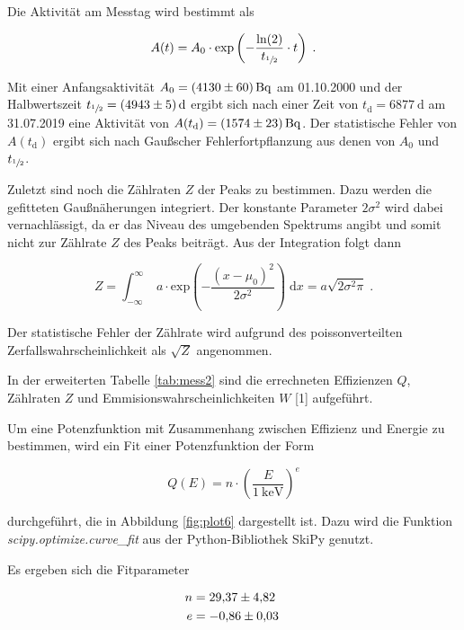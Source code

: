 Die Aktivität am Messtag wird bestimmt als

\begin{equation}
  A(t) = A_0 \cdot \text{exp} \left(- \frac{\text{ln}(2)}{t_{\sfrac{1}{2}}} \cdot t \right)  \; .
\end{equation}

Mit einer Anfangsaktivität $A_0 = \SI{4130 +- 60}{\becquerel}$ am 01.10.2000 und der Halbwertszeit
$t_{\sfrac{1}{2}} = \SI{4943 +- 5}{\day}$ ergibt sich nach einer Zeit von $t_\text{d} = \SI{6877}{\day}$
am 31.07.2019 eine Aktivität von $A(t_\text{d}) = \SI{1574 +- 23}{\becquerel}$.
Der statistische Fehler von $A(t_\text{d})$ ergibt sich nach 
Gaußscher Fehlerfortpflanzung aus denen von $A_0$ und $t_{\sfrac{1}{2}}$.

Zuletzt sind noch die Zählraten $Z$ der Peaks zu bestimmen. Dazu werden die gefitteten Gaußnäherungen integriert. 
Der konstante Parameter $2\sigma^2$ wird dabei vernachlässigt, da er das Niveau des umgebenden Spektrums angibt und somit nicht zur 
Zählrate $Z$ des Peaks beiträgt. Aus der Integration folgt dann

\begin{equation}
  Z = \int_{-\infty}^\infty \; a \cdot \text{exp}\left( - \frac{(x-\mu_0)^2}{2\sigma^2}\right) \; \text{d}x = a \sqrt{2\sigma^2\pi} \; .
  \label{eqn:rate}
\end{equation}

Der statistische Fehler der Zählrate wird aufgrund des poissonverteilten Zerfallswahrscheinlichkeit als $\sqrt{Z}$ angenommen.

In der erweiterten Tabelle \ref{tab:mess2} sind die errechneten Effizienzen $Q$, Zählraten $Z$ und 
Emmisionswahrscheinlichkeiten $W$ [1] aufgeführt.

Um eine Potenzfunktion mit Zusammenhang zwischen Effizienz und Energie zu bestimmen,
wird ein Fit einer Potenzfunktion der Form

\begin{equation}
    Q(E) = n \cdot (\frac{E}{\SI{1}{\kilo\eV}})^e
\end{equation}

durchgeführt, die in Abbildung \ref{fig:plot6} dargestellt ist.
Dazu wird die Funktion \textit{scipy.optimize.curve\_fit} aus der Python-Bibliothek SkiPy genutzt.

Es ergeben sich die Fitparameter

\begin{align*}
  n &= \num{29.37 +- 4.82} \\
  e &= \num{-0.86 +- 0.03} \; 
\end{align*}


